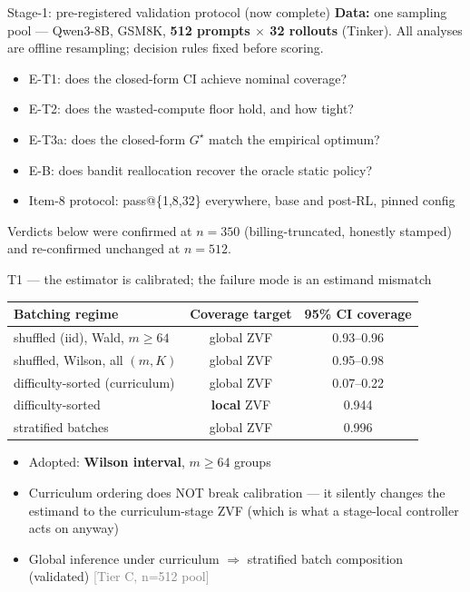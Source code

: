 \documentclass[aspectratio=169,11pt]{beamer}
\newcommand{\good}[1]{\textcolor{green!50!black}{#1}}
\newcommand{\warn}[1]{\textcolor{orange!80!black}{#1}}
\newcommand{\tier}[1]{\hfill{\scriptsize\textcolor{gray}{[#1]}}}
\begin{document}
\begin{frame}{Stage-1: pre-registered validation protocol (now complete)}
  \textbf{Data:} one sampling pool --- Qwen3-8B, GSM8K, \textbf{512 prompts
  $\times$ 32 rollouts} (Tinker). All analyses are offline resampling; decision
  rules fixed before scoring.
  \vspace{4pt}
  \begin{itemize}
    \item E-T1: does the closed-form CI achieve nominal coverage?
    \item E-T2: does the wasted-compute floor hold, and how tight?
    \item E-T3a: does the closed-form $G^\star$ match the empirical optimum?
    \item E-B: does bandit reallocation recover the oracle static policy?
    \item Item-8 protocol: pass@\{1,8,32\} everywhere, base and post-RL,
          pinned config
  \end{itemize}
  \vspace{4pt}
  \good{Verdicts below were confirmed at $n{=}350$ (billing-truncated,
  honestly stamped) and re-confirmed unchanged at $n{=}512$.}
\end{frame}

\begin{frame}{T1 --- the estimator is calibrated; the failure mode is an
  estimand mismatch}
  \centering
  \begin{tabular}{@{}lcc@{}}
    \toprule
    Batching regime & Coverage target & 95\% CI coverage \\
    \midrule
    shuffled (iid), Wald, $m{\ge}64$ & global ZVF & \good{0.93--0.96} \\
    shuffled, Wilson, all $(m,K)$    & global ZVF & \good{0.95--0.98} \\
    difficulty-sorted (curriculum)   & global ZVF & \warn{0.07--0.22} \\
    difficulty-sorted                & \textbf{local} ZVF & \good{0.944} \\
    stratified batches               & global ZVF & \good{0.996} \\
    \bottomrule
  \end{tabular}
  \vspace{6pt}
  \begin{itemize}
    \item Adopted: \textbf{Wilson interval}, $m\ge 64$ groups
    \item Curriculum ordering does NOT break calibration --- it silently
          changes the estimand to the curriculum-stage ZVF (which is what a
          stage-local controller acts on anyway)
    \item Global inference under curriculum $\Rightarrow$ stratified batch
          composition (validated) \tier{Tier C, n=512 pool}
  \end{itemize}
\end{frame}
\end{document}
